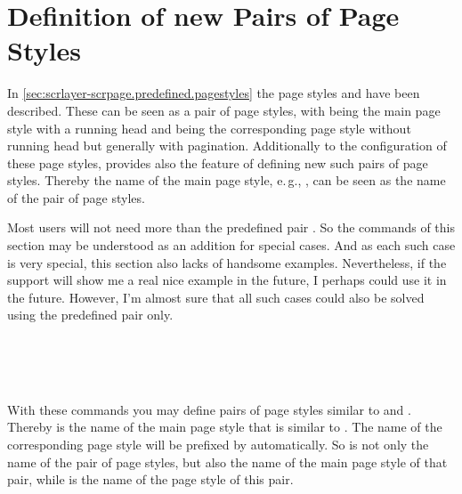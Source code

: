 
\section{Definition of new Pairs of Page Styles}
\label{sec:scrlayer-scrpage-experts.pagestyle.pairs}

In \autoref{sec:scrlayer-scrpage.predefined.pagestyles} the page styles
 and  have been
described. These can be seen as a pair of page styles, with
 being the main page style with a running head and
 being the corresponding  page
style without running head but generally with pagination. Additionally to the
configuration of these page styles,  provides also
the feature of defining new such pairs of page styles. Thereby the name of the
main page style, e.\,g., , can be seen as the name of the
pair of page styles.

Most users will not need more than the predefined pair
. So the commands of this section may be understood as
an addition for special cases. And as each such case is very special,
this section also lacks of handsome examples. Nevertheless, if the support
will show me a real nice example in the future, I perhaps could use it in
the future. However, I'm almost sure that all such cases could also be
solved using the predefined pair only.

\begin{Declaration}
  \\
  \\
  \\
\end{Declaration}
%
%
%
%
With these commands you may define pairs of page styles similar to
 and . Thereby
 is the name of the main page style that is similar to
. The name of the corresponding  page
style will be prefixed by  automatically. So  is
not only the name of the pair of page styles, but also the name of the main
page style of that pair, while  is the name of the
 page style of this pair.


